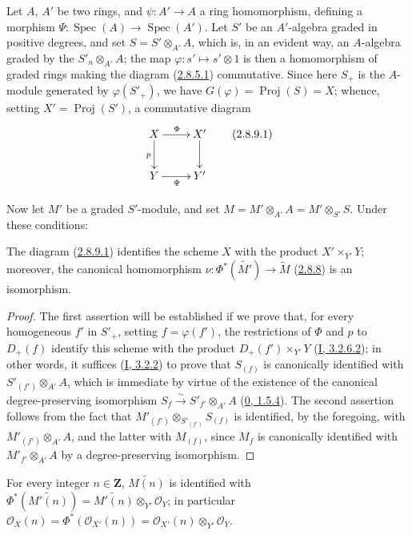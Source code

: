 \begin{env}[2.8.9]
\label{II.2.8.9}
Let $A$, $A'$ be two rings, and $\psi:A'\to A$ a ring homomorphism, defining
a morphism
$\Psi:\operatorname{Spec}(A)\to\operatorname{Spec}(A')$. Let $S'$ be an
$A'$-algebra graded in positive degrees, and set $S=S'\otimes_{A'}A$, which
is, in an evident way, an $A$-algebra graded by the $S'_n\otimes_{A'}A$;
the map $\varphi:s'\mapsto s'\otimes1$ is then a homomorphism of graded rings
making the diagram (\hyperref[II.2.8.5.1]{2.8.5.1}) commutative. Since here
$S_+$ is the $A$-module generated by $\varphi(S'_+)$, we have
$G(\varphi)=\operatorname{Proj}(S)=X$; whence, setting
$X'=\operatorname{Proj}(S')$, a commutative diagram
\[
\label{II.2.8.9.1}
  \xymatrix{
    X\ar[r]^{\Phi}\ar[d]_p & X'\ar[d]\\
    Y\ar[r]_{\Psi} & Y'
  }
\tag{2.8.9.1}
\]

Now let $M'$ be a graded $S'$-module, and set
$M=M'\otimes_{A'}A=M'\otimes_{S'}S$. Under these conditions:
\end{env}

\begin{proposition}[2.8.10]
\label{II.2.8.10}
The diagram (\hyperref[II.2.8.9.1]{2.8.9.1}) identifies the scheme $X$ with
the product $X'\times_{Y'}Y$; moreover, the canonical homomorphism
$\nu:\Phi^*(\widetilde{M'})\to\widetilde{M}$
(\hyperref[II.2.8.8]{2.8.8}) is an isomorphism.
\end{proposition}

\begin{proof}
The first assertion will be established if we prove that, for every
homogeneous $f'$ in $S'_+$, setting $f=\varphi(f')$, the restrictions of
$\Phi$ and $p$ to $D_+(f)$ identify this scheme with the product
$D_+(f')\times_{Y'}Y$ (\hyperref[I.3.2.6.2]{I, 3.2.6.2}); in other words,
it suffices (\hyperref[I.3.2.2]{I, 3.2.2}) to prove that $S_{(f)}$ is
canonically identified with $S'_{(f')}\otimes_{A'}A$, which is immediate by
virtue of the existence of the canonical degree-preserving isomorphism
$S_f\xrightarrow{\sim}S'_{f'}\otimes_{A'}A$
(\hyperref[0.1.5.4]{0, 1.5.4}). The second assertion follows from the fact
that $M'_{(f')}\otimes_{S'_{(f')}}S_{(f)}$ is identified, by the foregoing,
with $M'_{(f')}\otimes_{A'}A$, and the latter with $M_{(f)}$, since $M_f$ is
canonically identified with $M'_{f'}\otimes_{A'}A$ by a degree-preserving
isomorphism.
\end{proof}

\begin{corollary}[2.8.11]
\label{II.2.8.11}
For every integer $n\in\mathbf{Z}$, $\widetilde{M(n)}$ is identified with
$\Phi^*(\widetilde{M'(n)})=\widetilde{M'(n)}\otimes_{Y'}\mathcal{O}_Y$;
in particular
$\mathcal{O}_X(n)=\Phi^*(\mathcal{O}_{X'}(n))
=\mathcal{O}_{X'}(n)\otimes_{Y'}\mathcal{O}_Y$.
\end{corollary}

